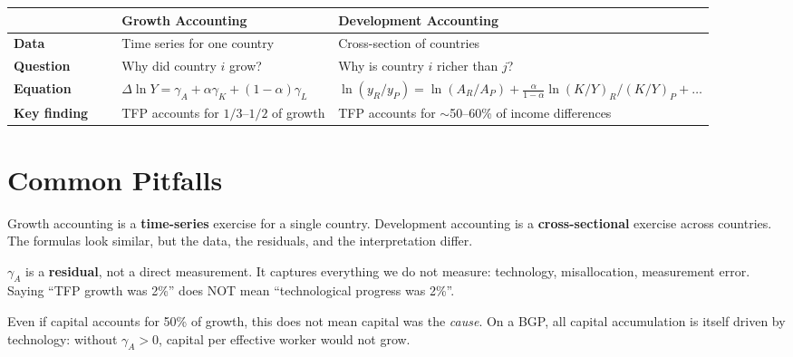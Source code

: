 \documentclass[a4paper,11pt]{article}
\newcommand{\gA}{\gamma_{A}}
\newcommand{\gK}{\gamma_{K}}
\newcommand{\gL}{\gamma_{L}}
\begin{document}
\begin{center}
\begin{tabular}{p{0.22\linewidth}p{0.34\linewidth}p{0.34\linewidth}}
\toprule
 & \textbf{Growth Accounting} & \textbf{Development Accounting} \\
\midrule
\textbf{Data} & Time series for one country & Cross-section of countries \\
\textbf{Question} & Why did country $i$ grow? & Why is country $i$ richer than $j$? \\
\textbf{Equation} & $\Delta \ln Y = \gA + \alpha \gK + (1-\alpha)\gL$ & $\ln(y_R/y_P) = \ln(A_R/A_P) + \frac{\alpha}{1-\alpha}\ln(K/Y)_R/(K/Y)_P + \ldots$ \\
\textbf{Key finding} & TFP accounts for $1/3$--$1/2$ of growth & TFP accounts for $\sim$50--60\% of income differences \\
\bottomrule
\end{tabular}
\end{center}

\clearpage

\section{Common Pitfalls}

\begin{pitfallbox}[title={Pitfall 1: Confusing Growth Accounting and Development Accounting}]
Growth accounting is a \textbf{time-series} exercise for a single country. Development accounting is a \textbf{cross-sectional} exercise across countries. The formulas look similar, but the data, the residuals, and the interpretation differ.
\end{pitfallbox}

\begin{pitfallbox}[title={Pitfall 2: Treating the Solow Residual as a Direct Measure}]
$\gA$ is a \textbf{residual}, not a direct measurement. It captures everything we do not measure: technology, misallocation, measurement error. Saying ``TFP growth was 2\%'' does NOT mean ``technological progress was 2\%''.
\end{pitfallbox}

\begin{pitfallbox}[title={Pitfall 3: Growth Accounting $\neq$ Causality}]
Even if capital accounts for 50\% of growth, this does not mean capital was the \textit{cause}. On a BGP, all capital accumulation is itself driven by technology: without $\gA > 0$, capital per effective worker would not grow.
\end{pitfallbox}
\end{document}
